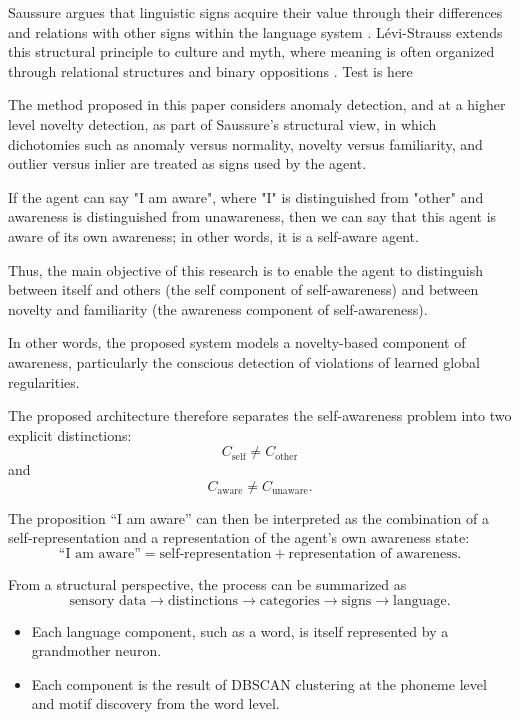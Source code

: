 \documentclass[a4paper]{article}
\begin{document}
   Saussure argues that linguistic signs acquire their value through their differences and relations with other signs within the language system \cite{saussure-1966-course-in-general-linguistics}. Lévi-Strauss extends this structural principle to culture and myth, where meaning is often organized through relational structures and binary oppositions \cite{levi-strauss-1955-the-structural-study-of-myth}.
   Test is here

   The method proposed in this paper considers anomaly detection, and at a higher level novelty detection, as part of Saussure's structural view, in which dichotomies such as anomaly versus normality, novelty versus familiarity, and outlier versus inlier are treated as signs used by the agent.

   If the agent can say "I am aware", where "I" is distinguished from "other" and awareness is distinguished from unawareness, then we can say that this agent is aware of its own awareness; in other words, it is a self-aware agent.

   Thus, the main objective of this research is to enable the agent to distinguish between itself and others (the self component of self-awareness) and between novelty and familiarity (the awareness component of self-awareness).

   In other words, the proposed system models a novelty-based component of awareness, particularly the conscious detection of violations of learned global regularities.


   The proposed architecture therefore separates the self-awareness problem into two explicit distinctions:
   \[
   C_{\mathrm{self}} \neq C_{\mathrm{other}}
   \]
   and
   \[
   C_{\mathrm{aware}} \neq C_{\mathrm{unaware}}.
   \]

   The proposition ``I am aware'' can then be interpreted as the combination of a self-representation and a representation of the agent's own awareness state:
   \[
   \text{``I am aware''}
   =
   \text{self-representation}
   +
   \text{representation of awareness}.
   \]

   From a structural perspective, the process can be summarized as
   \[
   \text{sensory data}
   \rightarrow
   \text{distinctions}
   \rightarrow
   \text{categories}
   \rightarrow
   \text{signs}
   \rightarrow
   \text{language}.
   \]


   \begin{itemize}
      \item Each language component, such as a word, is itself represented by a grandmother neuron.
      \item Each component is the result of DBSCAN clustering at the phoneme level and motif discovery from the word level.
   \end{itemize}
\end{document}
